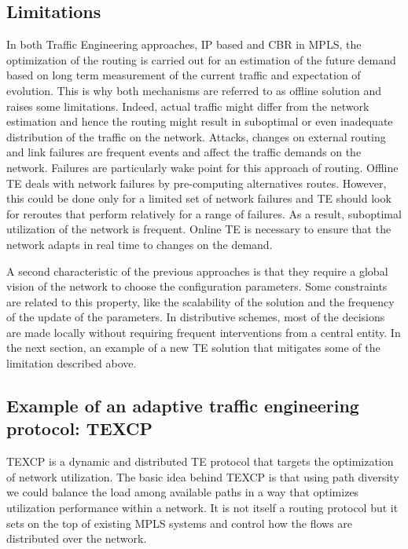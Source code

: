 \subsection{Limitations}
	In both Traffic Engineering approaches, IP based and CBR in MPLS, the optimization of the routing is carried out for an estimation of the future demand based on long term measurement of the current traffic and expectation of evolution.  This is why both mechanisms are referred to as offline solution and raises some limitations. Indeed, actual traffic might differ from the network estimation and hence the routing might result in suboptimal or even inadequate distribution of the traffic on the network. Attacks, changes on external routing and link failures are frequent events and affect the traffic demands on the network. Failures are particularly wake point for this approach of routing. Offline TE deals with network failures by pre-computing alternatives routes. However, this could be done only for a limited set of network failures and TE should look for reroutes that perform relatively for a range of failures. As a result, suboptimal utilization of the network is frequent. Online TE is necessary to ensure that the network adapts in real time to changes on the demand.
	
A second characteristic of the previous approaches is that they require a global vision of the network to choose the configuration parameters. Some constraints are related to this property, like the scalability of the solution and the frequency of the update of the parameters. In distributive schemes, most of the decisions are made locally without requiring frequent interventions from a  central entity. 
In the next section, an example of a new TE solution that mitigates some of the limitation described above.

\subsection{Example of an adaptive traffic engineering protocol: TEXCP }

TEXCP is a dynamic and distributed TE protocol that targets the optimization of network utilization. The basic idea behind TEXCP is that using path diversity we could balance the load among available paths in a way that optimizes utilization performance within a network. It is not itself a routing protocol but it sets on the top of existing MPLS systems and control how the flows are distributed over the network.

